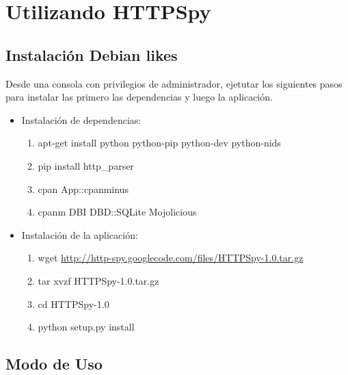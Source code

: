 \section{Utilizando HTTPSpy}

\subsection{Instalación Debian likes}
Desde una consola con privilegios de administrador, ejetutar los siguientes pasos para instalar las primero las dependencias y luego la aplicación.
\begin{itemize}
\item Instalación de dependencias:
\begin{enumerate}
	\item apt-get install python python-pip python-dev python-nids
	\item pip install http\_parser
	\item cpan App::cpanminus
	\item cpanm DBI DBD::SQLite Mojolicious
\end{enumerate}

\item Instalación de la aplicación:
\begin{enumerate}
	\item wget \url{http://http-spy.googlecode.com/files/HTTPSpy-1.0.tar.gz}
	\item tar xvzf HTTPSpy-1.0.tar.gz
	\item cd HTTPSpy-1.0
	\item python setup.py install
\end{enumerate}
\end{itemize}
\subsection{Modo de Uso}

